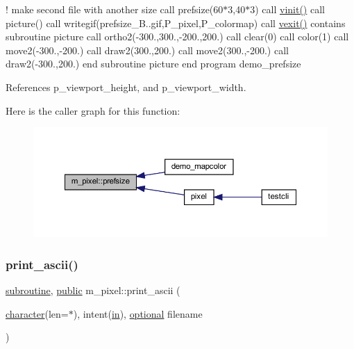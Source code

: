 ! make second file with another size call prefsize(60$\ast$3,40$\ast$3) call \hyperlink{namespacem__pixel_ac03ca8f23fdadb60599b6ea4dc87a6d9}{vinit()} call picture() call writegif(\textquotesingle{}prefsize\+\_\+\+B..\+gif\textquotesingle{},P\+\_\+pixel,P\+\_\+colormap) call \hyperlink{namespacem__pixel_a19ad6b65752322b0029a62cc0ebec3e8}{vexit()} contains subroutine picture call ortho2(-\/300.,300.,-\/200.,200.) call clear(0) call color(1) call move2(-\/300.,-\/200.) call draw2(300.,200.) call move2(300.,-\/200.) call draw2(-\/300.,200.) end subroutine picture end program demo\+\_\+prefsize 

References p\+\_\+viewport\+\_\+height, and p\+\_\+viewport\+\_\+width.

Here is the caller graph for this function\+:
\nopagebreak
\begin{figure}[H]
\begin{center}
\leavevmode
\includegraphics[width=350pt]{namespacem__pixel_acc868686f05b7e0b3cd33bf9d1c6bb98_icgraph}
\end{center}
\end{figure}
\mbox{\label{namespacem__pixel_ab2bb47aea567667b1b92c8265bcb36fb}} 
\subsubsection{\texorpdfstring{print\+\_\+ascii()}{print\_ascii()}}
{\footnotesize\ttfamily \hyperlink{M__stopwatch_83_8txt_acfbcff50169d691ff02d4a123ed70482}{subroutine}, \hyperlink{M__stopwatch_83_8txt_a2f74811300c361e53b430611a7d1769f}{public} m\+\_\+pixel\+::print\+\_\+ascii (\begin{DoxyParamCaption}\item[{\hyperlink{option__stopwatch_83_8txt_abd4b21fbbd175834027b5224bfe97e66}{character}(len=$\ast$), intent(\hyperlink{M__journal_83_8txt_afce72651d1eed785a2132bee863b2f38}{in}), \hyperlink{option__stopwatch_83_8txt_aa4ece75e7acf58a4843f70fe18c3ade5}{optional}}]{filename }\end{DoxyParamCaption})}



